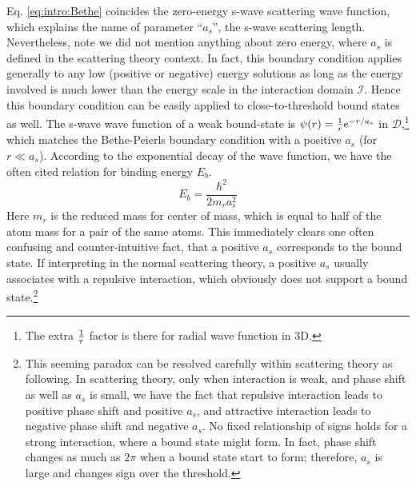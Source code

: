 Eq. \ref{eq:intro:Bethe} coincides the zero-energy s-wave scattering wave function, which explains the name of parameter ``$a_s$'', the s-wave scattering length. Nevertheless,   note we did not mention anything about zero energy, where $a_{s}$ is defined in the scattering theory context.  In fact,  this boundary condition applies generally to  any low (positive or negative) energy solutions as long as the energy involved is much lower than the energy scale in the interaction domain $\mathcal{I}$.  Hence this boundary condition can be easily  applied  to close-to-threshold bound states as well.  The s-wave wave function of a weak bound-state is $\psi(r)=\frac{1}{r}e^{-r/a_s}$ in $\mathcal{D}$,\footnote{The extra $\frac{1}{r}$ factor is there for  radial wave function in 3D.} which matches the Bethe-Peierls boundary condition with a positive $a_{s}$ (for  $r\ll{}a_{s}$). According to  the exponential decay of the wave function,  we have the often cited relation for binding energy $E_{b}$.
\begin{equation}
 E_{b}=\frac{\hbar^{2}}{2m_{r}a_{s}^{2}}
\end{equation}
Here $m_{r}$ is the reduced mass for center of mass, which is equal to half of the atom mass for a pair of the same atoms.  This immediately clears one often confusing and counter-intuitive fact, that a positive  $a_s$ corresponds to the bound state.  If interpreting in the normal scattering theory, a positive $a_s$  usually associates with a repulsive interaction, which obviously does not support a bound state.\footnote{This seeming paradox can be resolved carefully within scattering theory as following. In scattering theory, only when interaction is weak, and phase shift as well as $a_s$ is small, we have the fact that  repulsive interaction leads to positive phase shift and  positive $a_s$, and attractive interaction leads to negative phase shift and negative $a_s$.  No fixed relationship of signs holds for a strong interaction, where a bound state might form.  In fact, phase shift changes as much as $2\pi$ when a bound state start to form; therefore, $a_s$ is large and  changes sign over the threshold. }

